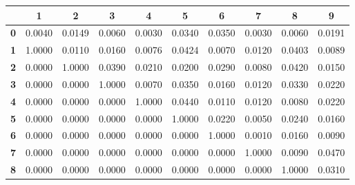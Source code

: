 \begin{tiny}\begin{tabular}{|l|c|c|c|c|c|c|c|c|c|}
\hline
&\textbf{1}&\textbf{2}&\textbf{3}&\textbf{4}&\textbf{5}&\textbf{6}&\textbf{7}&\textbf{8}&\textbf{9}\\\hline
\textbf{0}&0.0040&0.0149&0.0060&0.0030&0.0340&0.0350&0.0030&0.0060&0.0191\\\hline
\textbf{1}&1.0000&0.0110&0.0160&0.0076&0.0424&0.0070&0.0120&0.0403&0.0089\\\hline
\textbf{2}&0.0000&1.0000&0.0390&0.0210&0.0200&0.0290&0.0080&0.0420&0.0150\\\hline
\textbf{3}&0.0000&0.0000&1.0000&0.0070&0.0350&0.0160&0.0120&0.0330&0.0220\\\hline
\textbf{4}&0.0000&0.0000&0.0000&1.0000&0.0440&0.0110&0.0120&0.0080&0.0220\\\hline
\textbf{5}&0.0000&0.0000&0.0000&0.0000&1.0000&0.0220&0.0050&0.0240&0.0160\\\hline
\textbf{6}&0.0000&0.0000&0.0000&0.0000&0.0000&1.0000&0.0010&0.0160&0.0090\\\hline
\textbf{7}&0.0000&0.0000&0.0000&0.0000&0.0000&0.0000&1.0000&0.0090&0.0470\\\hline
\textbf{8}&0.0000&0.0000&0.0000&0.0000&0.0000&0.0000&0.0000&1.0000&0.0310\\\hline
\end{tabular}
\end{tiny}